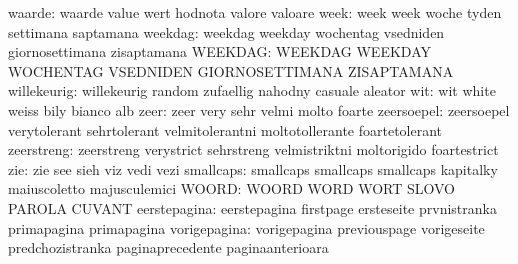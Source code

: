                    waarde: waarde                    value
                           wert                      hodnota
                           valore                    valoare
                     week: week                      week
                           woche                     tyden
                           settimana                 saptamana
                  weekdag: weekdag                   weekday
                           wochentag                 vsedniden
                           giornosettimana           zisaptamana
                  WEEKDAG: WEEKDAG                   WEEKDAY
                           WOCHENTAG                 VSEDNIDEN
                           GIORNOSETTIMANA           ZISAPTAMANA
              willekeurig: willekeurig               random
                           zufaellig                 nahodny
                           casuale                   aleator
                      wit: wit                       white
                           weiss                     bily
                           bianco                    alb
                     zeer: zeer                      very
                           sehr                      velmi
                           molto                     foarte
               zeersoepel: zeersoepel                verytolerant
                           sehrtolerant              velmitolerantni
                           moltotollerante           foartetolerant
               zeerstreng: zeerstreng                verystrict
                           sehrstreng                velmistriktni
                           moltorigido               foartestrict %
                      zie: zie                       see
                           sieh                      viz
                           vedi                      vezi
                smallcaps: smallcaps                 smallcaps
                           smallcaps                 kapitalky
                           maiuscoletto              majusculemici
                    WOORD: WOORD                     WORD
                           WORT                      SLOVO
                           PAROLA                    CUVANT
             eerstepagina: eerstepagina              firstpage
                           ersteseite                prvnistranka
                           primapagina               primapagina
             vorigepagina: vorigepagina              previouspage
                           vorigeseite               predchozistranka
                           paginaprecedente          paginaanterioara
